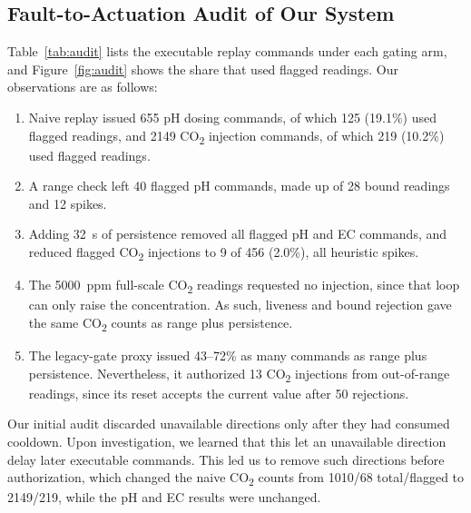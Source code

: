 \documentclass[preprint,12pt,doubleblind]{elsarticle}
\newcommand{\COtwo}{CO\textsubscript{2}}
\begin{document}
\subsection{Fault-to-Actuation Audit of Our System}
Table~\ref{tab:audit} lists the executable replay commands under each gating arm, and Figure~\ref{fig:audit} shows the share that used flagged readings. Our observations are as follows:
\begin{enumerate}
\item Naive replay issued 655 pH dosing commands, of which 125 (19.1\%) used flagged readings, and 2149 \COtwo{} injection commands, of which 219 (10.2\%) used flagged readings.
\item A range check left 40 flagged pH commands, made up of 28 bound readings and 12 spikes.
\item Adding 32~s of persistence removed all flagged pH and EC commands, and reduced flagged \COtwo{} injections to 9 of 456 (2.0\%), all heuristic spikes.
\item The 5000~ppm full-scale \COtwo{} readings requested no injection, since that loop can only raise the concentration. As such, liveness and bound rejection gave the same \COtwo{} counts as range plus persistence.
\item The legacy-gate proxy issued 43--72\% as many commands as range plus persistence. Nevertheless, it authorized 13 \COtwo{} injections from out-of-range readings, since its reset accepts the current value after 50 rejections.
\end{enumerate}
Our initial audit discarded unavailable directions only after they had consumed cooldown. Upon investigation, we learned that this let an unavailable direction delay later executable commands. This led us to remove such directions before authorization, which changed the naive \COtwo{} counts from 1010/68 total/flagged to 2149/219, while the pH and EC results were unchanged.
\end{document}
